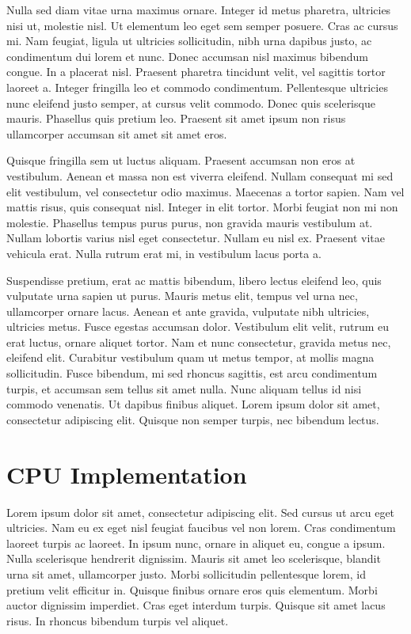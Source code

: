 \documentclass[a4paper,11pt]{kth-mag}
\begin{document}
Nulla sed diam vitae urna maximus ornare. Integer id metus pharetra, ultricies nisi ut, molestie nisl. Ut elementum leo eget sem semper posuere. Cras ac cursus mi. Nam feugiat, ligula ut ultricies sollicitudin, nibh urna dapibus justo, ac condimentum dui lorem et nunc. Donec accumsan nisl maximus bibendum congue. In a placerat nisl. Praesent pharetra tincidunt velit, vel sagittis tortor laoreet a. Integer fringilla leo et commodo condimentum. Pellentesque ultricies nunc eleifend justo semper, at cursus velit commodo. Donec quis scelerisque mauris. Phasellus quis pretium leo. Praesent sit amet ipsum non risus ullamcorper accumsan sit amet sit amet eros.

Quisque fringilla sem ut luctus aliquam. Praesent accumsan non eros at vestibulum. Aenean et massa non est viverra eleifend. Nullam consequat mi sed elit vestibulum, vel consectetur odio maximus. Maecenas a tortor sapien. Nam vel mattis risus, quis consequat nisl. Integer in elit tortor. Morbi feugiat non mi non molestie. Phasellus tempus purus purus, non gravida mauris vestibulum at. Nullam lobortis varius nisl eget consectetur. Nullam eu nisl ex. Praesent vitae vehicula erat. Nulla rutrum erat mi, in vestibulum lacus porta a.

Suspendisse pretium, erat ac mattis bibendum, libero lectus eleifend leo, quis vulputate urna sapien ut purus. Mauris metus elit, tempus vel urna nec, ullamcorper ornare lacus. Aenean et ante gravida, vulputate nibh ultricies, ultricies metus. Fusce egestas accumsan dolor. Vestibulum elit velit, rutrum eu erat luctus, ornare aliquet tortor. Nam et nunc consectetur, gravida metus nec, eleifend elit. Curabitur vestibulum quam ut metus tempor, at mollis magna sollicitudin. Fusce bibendum, mi sed rhoncus sagittis, est arcu condimentum turpis, et accumsan sem tellus sit amet nulla. Nunc aliquam tellus id nisi commodo venenatis. Ut dapibus finibus aliquet. Lorem ipsum dolor sit amet, consectetur adipiscing elit. Quisque non semper turpis, nec bibendum lectus.

\chapter{CPU Implementation}



Lorem ipsum dolor sit amet, consectetur adipiscing elit. Sed cursus ut arcu eget ultricies. Nam eu ex eget nisl feugiat faucibus vel non lorem. Cras condimentum laoreet turpis ac laoreet. In ipsum nunc, ornare in aliquet eu, congue a ipsum. Nulla scelerisque hendrerit dignissim. Mauris sit amet leo scelerisque, blandit urna sit amet, ullamcorper justo. Morbi sollicitudin pellentesque lorem, id pretium velit efficitur in. Quisque finibus ornare eros quis elementum. Morbi auctor dignissim imperdiet. Cras eget interdum turpis. Quisque sit amet lacus risus. In rhoncus bibendum turpis vel aliquet.
\end{document}
